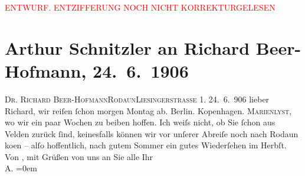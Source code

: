 
\begin{center}
            \textcolor{red}{ENTWURF. ENTZIFFERUNG NOCH NICHT KORREKTURGELESEN}
                      \end{center}
            
               \section[Arthur Schnitzler an Richard Beer-Hofmann, 24. 6. 1906]{ Arthur Schnitzler an Richard Beer-Hofmann, 24. 6. 1906}\nopagebreak{}\rehead{ }\begin{ledgroupsized}[t]{13cm}\normalsize\beginnumbering{} \toendnotes[C]{\smallbreak\pagebreak[2]} 
\pstart{}{\pb}\textsc{Dr. Richard Beer-Hofmann}\pend{}\pstart{}\textsc{Rodaun}\pend{}\pstart{}\textsc{Liesingerstraße} 1.\pend{}{\bigskip}\pstart
           \raggedleft{}{\pb}24. 6. 906\pend
           \pstart{}lieber Richard, \pend\pstart
           wir reiſen ſchon morgen Montag ab. Berlin. Kopenhagen. \textsc{Marienlyst}, wo wir ein paar Wochen zu beiben hoffen. Ich weiſs nicht, ob Sie ſchon aus Velden zurück ſind, keinesfalls können wir vor
               unſerer Abreiſe noch nach Rodaun ko{\geminationm}en – alſo hoffentlich, nach gutem Sommer ein gutes
               Wiederſehen im Herbſt. \pend
           \pstart
           Von \damage{\textcolor{gray}{Herzen}}, mit Grüßen von uns an Sie alle\pend
           \pstart
           Ihr{\\[\baselineskip]}\spacefill\mbox{A.}\pend
           \leftskip=0em{}\endnumbering{}\end{ledgroupsized}  \newcommand{\dateiname}{L01603}\newcommand{\titel}{Arthur Schnitzler an Richard Beer-Hofmann, 24. 6. 1906}\newcommand{\editorInnen}{Martin Anton Müller und Gerd-Hermann Susen}
      